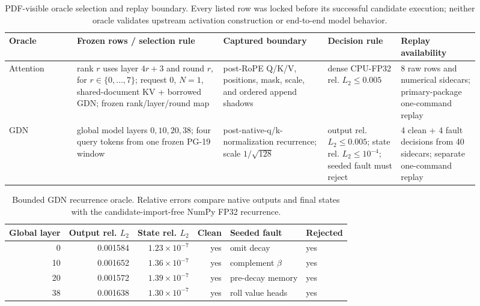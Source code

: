 \documentclass{article}
\begin{document}
\begin{table}[H]
\caption{PDF-visible oracle selection and replay boundary.  Every listed row
was locked before its successful candidate execution; neither oracle validates
upstream activation construction or end-to-end model behavior.}
\label{tab:oracle-selection}
\centering\scriptsize
\setlength{\tabcolsep}{3pt}
\begin{tabular}{@{}p{0.13\linewidth}p{0.29\linewidth}p{0.20\linewidth}p{0.14\linewidth}p{0.15\linewidth}@{}}
\toprule
Oracle & Frozen rows / selection rule & Captured boundary & Decision rule & Replay availability \\
\midrule
Attention & rank $r$ uses layer $4r+3$ and round $r$, for
$r\in\{0,\ldots,7\}$; request 0, $N=1$, shared-document KV + borrowed GDN;
frozen rank/layer/round map
& post-RoPE Q/K/V, positions, mask, scale, and ordered append shadows
& dense CPU-FP32 rel. $L_2\leq0.005$
& 8 raw rows and numerical sidecars; primary-package one-command replay \\
GDN & global model layers $0,10,20,38$; four query tokens from one frozen PG-19 window
& post-native-q/k-normalization recurrence; scale $1/\sqrt{128}$
& output rel. $L_2\leq0.005$; state rel. $L_2\leq10^{-4}$; seeded fault must reject
& 4 clean + 4 fault decisions from 40 sidecars; separate one-command replay \\
\bottomrule
\end{tabular}
\end{table}

\begin{table}[H]
\caption{Bounded GDN recurrence oracle.  Relative errors compare native outputs
and final states with the candidate-import-free NumPy FP32 recurrence.}
\label{tab:gdn-oracle}
\centering\small
\begin{tabular}{@{}rrrrll@{}}
\toprule
Global layer & Output rel. $L_2$ & State rel. $L_2$ & Clean & Seeded fault & Rejected \\
\midrule
0  & 0.001584 & $1.23\times10^{-7}$ & yes & omit decay & yes \\
10 & 0.001652 & $1.36\times10^{-7}$ & yes & complement $\beta$ & yes \\
20 & 0.001572 & $1.39\times10^{-7}$ & yes & pre-decay memory & yes \\
38 & 0.001638 & $1.30\times10^{-7}$ & yes & roll value heads & yes \\
\bottomrule
\end{tabular}
\end{table}
\end{document}
